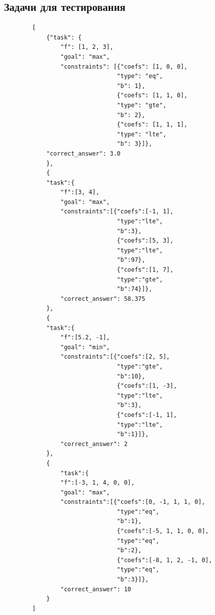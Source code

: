\documentclass{article}
\begin{document}
\subsection{Задачи для тестирования}
\begin{listing}[H]
    \begin{verbatim}
        [
            {"task": {
                "f": [1, 2, 3],
                "goal": "max",
                "constraints": [{"coefs": [1, 0, 0],
                                "type": "eq",
                                "b": 1},
                                {"coefs": [1, 1, 0],
                                "type": "gte",
                                "b": 2},
                                {"coefs": [1, 1, 1],
                                "type": "lte",
                                "b": 3}]},
            "correct_answer": 3.0
            },
            {
            "task":{
                "f":[3, 4],
                "goal": "max",
                "constraints":[{"coefs":[-1, 1],
                                "type":"lte",
                                "b":3},
                                {"coefs":[5, 3],
                                "type":"lte",
                                "b":97},
                                {"coefs":[1, 7],
                                "type":"gte",
                                "b":74}]},
                "correct_answer": 58.375
            },
            {
            "task":{
                "f":[5.2, -1],
                "goal": "min",
                "constraints":[{"coefs":[2, 5],
                                "type":"gte",
                                "b":10},
                                {"coefs":[1, -3],
                                "type":"lte",
                                "b":3},
                                {"coefs":[-1, 1],
                                "type":"lte",
                                "b":1}]},
                "correct_answer": 2
            },
            {
                "task":{
                "f":[-3, 1, 4, 0, 0],
                "goal": "max",
                "constraints":[{"coefs":[0, -1, 1, 1, 0],
                                "type":"eq",
                                "b":1},
                                {"coefs":[-5, 1, 1, 0, 0],
                                "type":"eq",
                                "b":2},
                                {"coefs":[-8, 1, 2, -1, 0],
                                "type":"eq",
                                "b":3}]},
                "correct_answer": 10
            }
        ]        
    \end{verbatim}
\end{listing}
\end{document}
